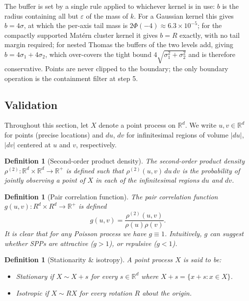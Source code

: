\documentclass[11pt,letterpaper]{article}
\newcommand{\R}{\mathbb{R}}
\newcommand{\1}{\mathds{1}}
\theoremstyle{plain}
\theoremstyle{definitioncolon}
\newtheorem{definition}[theorem]{Definition}
\begin{document}
The buffer is set by a single rule applied to whichever kernel is in use: $b$ is
the radius containing all but $\varepsilon$ of the mass of $k$. For a Gaussian
kernel this gives $b = 4\sigma$, at which the per-axis tail mass is
$2\Phi(-4) \approx 6.3 \times 10^{-5}$; for the compactly supported Mat\'ern
cluster kernel it gives $b = R$ exactly, with no tail margin required; for nested
Thomas the buffers of the two levels add, giving $b = 4\sigma_1 + 4\sigma_2$,
which over-covers the tight bound $4\sqrt{\sigma_1^2 + \sigma_2^2}$ and is
therefore conservative. Points are never clipped to the boundary; the only
boundary operation is the containment filter at step 5.
\subsection{Validation}
\label{ssec:verification}

Throughout this section, let $X$ denote a point process on $\R^d$. We write
$u, v \in \R^d$ for points (precise locations) and $du$, $dv$ for infinitesimal
regions of volume $|du|$, $|dv|$ centered at $u$ and $v$, respectively.

    \begin{definition}[Second-order product density]
        The second-order product density
        $\rho^{(2)}: \R^d \times \R^d \rightarrow \R^+$
        is defined such that $\rho^{(2)}(u, v)\,du\,dv$ is the probability of
        jointly observing a point of $X$ in each of the infinitesimal regions
        $du$ and $dv$.
    \end{definition}

    \begin{definition}[Pair correlation function]
        The pair correlation function $g(u, v): R^d \times R^d \rightarrow \R^+$
        is defined
        \[
        g(u, v) = \frac{\rho^{(2)}(u, v)}{\rho(u)\rho(v)}.
        \]
    It is clear that for any Poisson process we have $g \equiv 1$. Intuitively,
    $g$ can suggest whether SPPs are attractive ($g > 1$), or repulsive
    ($g < 1$).
    \end{definition}

    \begin{definition}[Stationarity \& isotropy]
        A point process $X$ is said to be:
            \begin{itemize}
                \item \emph{Stationary} if $X \sim X + s$ for every
                $s \in \R^d$ where $X + s = \{x + s: x \in X\}$.
                \item \emph{Isotropic} if $X \sim RX$ for every rotation $R$
                about the origin.
            \end{itemize}
    \end{definition}
\end{document}
